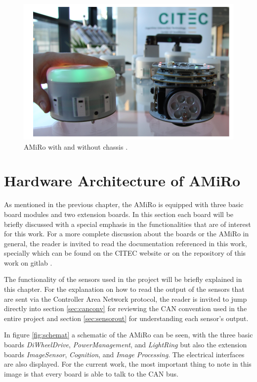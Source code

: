 \documentclass[12pt]{report}%
\begin{document}
\begin{figure}[h]
	\centering
	\includegraphics[width=\textwidth]{real_amiro_1}
    \caption{AMiRo with and without chassis \cite{AMiRo_paper_modular}.}
    \label{fig:real_1}
\end{figure}
\clearpage

\section{Hardware Architecture of AMiRo}
As mentioned in the previous chapter, the AMiRo is equipped with three basic board modules and two extension boards. In this section each board will be briefly discussed with a special emphasis in the functionalities that are of interest for this work. For a more complete discussion about the boards or the AMiRo in general, the reader is invited to read the documentation referenced in this work, specially \cite{AMiRo_paper_verstaile, AMiRo_paper_modular, AMiRo_paper_applications, AMiRo_ppt_v1, AMiRo_ppt_v2} which can be found on the CITEC website or on the repository of this work on gitlab \cite{AMiRo_Git}.

The functionality of the sensors used in the project will be briefly explained in this chapter. For the explanation on how to read the output of the sensors that are sent via the Controller Area Network protocol, the reader is invited to jump directly into section \ref{sec:canconv} for reviewing the CAN convention used in the entire project and section \ref{sec:sensorout} for understanding each sensor's output.

In figure \ref{fig:schemat} a schematic of the AMiRo can be seen, with the three basic boards \textit{DiWheelDrive}, \textit{PowerManagement}, and \textit{LightRing} but also the extension boards \textit{ImageSensor}, \textit{Cognition}, and \textit{Image Processing}. The electrical interfaces are also displayed. For the current work, the most important thing to note in this image is that every board is able to talk to the CAN bus.
\end{document}
